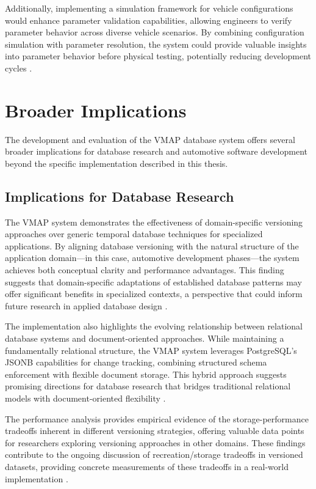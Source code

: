 Additionally, implementing a simulation framework for vehicle configurations would enhance parameter validation capabilities, allowing engineers to verify parameter behavior across diverse vehicle scenarios. By combining configuration simulation with parameter resolution, the system could provide valuable insights into parameter behavior before physical testing, potentially reducing development cycles \cite{staron2021automotive}.

\section{Broader Implications}
\label{sec:broader-implications}

The development and evaluation of the VMAP database system offers several broader implications for database research and automotive software development beyond the specific implementation described in this thesis.

\subsection{Implications for Database Research}
\label{subsec:database-research-implications}

The VMAP system demonstrates the effectiveness of domain-specific versioning approaches over generic temporal database techniques for specialized applications. By aligning database versioning with the natural structure of the application domain—in this case, automotive development phases—the system achieves both conceptual clarity and performance advantages. This finding suggests that domain-specific adaptations of established database patterns may offer significant benefits in specialized contexts, a perspective that could inform future research in applied database design \cite{bhattacherjee2015principles}.

The implementation also highlights the evolving relationship between relational database systems and document-oriented approaches. While maintaining a fundamentally relational structure, the VMAP system leverages PostgreSQL's JSONB capabilities for change tracking, combining structured schema enforcement with flexible document storage. This hybrid approach suggests promising directions for database research that bridges traditional relational models with document-oriented flexibility \cite{obe2017postgresql}.

The performance analysis provides empirical evidence of the storage-performance tradeoffs inherent in different versioning strategies, offering valuable data points for researchers exploring versioning approaches in other domains. These findings contribute to the ongoing discussion of recreation/storage tradeoffs in versioned datasets, providing concrete measurements of these tradeoffs in a real-world implementation \cite{bhattacherjee2015principles}.

